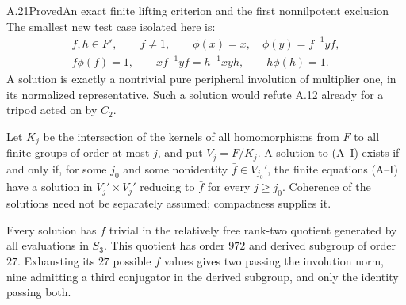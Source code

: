 \begin{statement}{A.21}{Proved}{An exact finite lifting criterion and the first nonnilpotent exclusion}
The smallest new test case isolated here is:
\[
 \begin{gathered}
  f,h\in F',\qquad f\ne1,\qquad
  \phi(x)=x,\quad\phi(y)=f^{-1}yf,\\
  f\phi(f)=1,\qquad
  x f^{-1}yf=h^{-1}xyh,\qquad h\phi(h)=1.
 \end{gathered}
 \tag{A--I}
\]
A solution is exactly a nontrivial pure peripheral
involution of multiplier one, in its normalized
representative. Such a solution would refute A.12 already
for a tripod acted on by $C_2$.

Let $K_j$ be the intersection of the kernels of all
homomorphisms from $F$ to all finite groups of order at
most $j$, and put $V_j=F/K_j$. A solution to
\textup{(A--I)} exists if and only if, for some $j_0$ and
some nonidentity $\bar f\in V_{j_0}'$, the finite
equations \textup{(A--I)} have a solution in
$V_j'\times V_j'$ reducing to $\bar f$ for every
$j\ge j_0$. Coherence of the solutions need not be
separately assumed; compactness supplies it.

Every solution has $f$ trivial in the relatively free
rank-two quotient generated by all evaluations in $S_3$.
This quotient has order $972$ and derived subgroup of
order $27$. Exhausting its $27$ possible $f$ values gives
two passing the involution norm, nine admitting a third
conjugator in the derived subgroup, and only the identity
passing both.
\end{statement}
